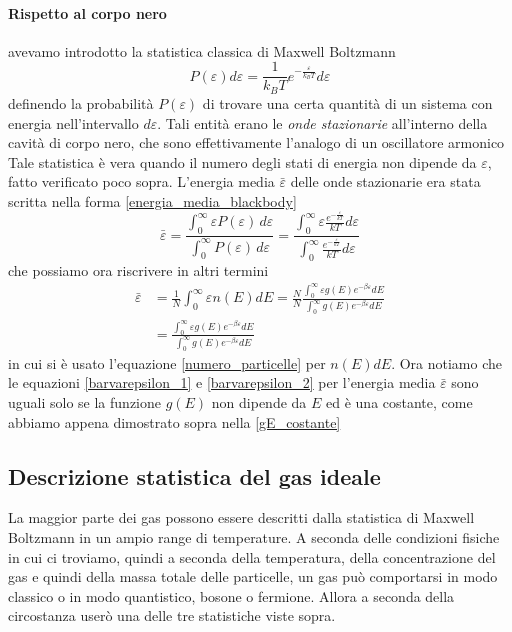 \paragraph{Rispetto al corpo nero} avevamo introdotto la statistica classica di Maxwell Boltzmann 
\begin{equation}
P(\varepsilon) d\varepsilon = \frac{1}{k_BT} e^{ -\frac{\varepsilon}{k_BT} } d\varepsilon
\end{equation}
definendo la probabilità $P(\varepsilon)$ di trovare una certa quantità di un sistema con energia nell'intervallo $d\varepsilon$.
Tali entità erano le \textit{onde stazionarie} all'interno della cavità di corpo nero, che sono effettivamente l'analogo di un oscillatore armonico
Tale statistica è vera quando il numero degli stati di energia non dipende da $\varepsilon$, fatto verificato poco sopra.
L'energia media $\bar \varepsilon$ delle onde stazionarie era stata scritta nella forma \ref{energia_media_blackbody}
\begin{equation}
\bar\varepsilon=\frac{\int_{0}^{\infty} \varepsilon P(\varepsilon)\,d\varepsilon}{\int_{0}^{\infty} P(\varepsilon)\,d\varepsilon} = \frac{\int_{0}^{\infty} \varepsilon \frac{ e^{ - \frac{\varepsilon}{kT } } }{kT } d\varepsilon}{\int_{0}^{\infty} \frac{ e^{ - \frac{\varepsilon}{kT } } }{kT }d\varepsilon}
\label{barvarepsilon_1}
\end{equation}
che possiamo ora riscrivere in altri termini
\begin{equation}
\begin{split}
\bar \varepsilon & = \frac{1}{N} \int_0^{\infty} \varepsilon n(E)dE = \frac{N}{N} \frac{  \int_0^{\infty} \varepsilon g(E) e^{ -\beta \varepsilon } dE  }{  \int_0^{\infty} g(E) e^{ -\beta \varepsilon } dE  } \\
& = \frac{  \int_0^{\infty} \varepsilon g(E) e^{ -\beta \varepsilon } dE  }{  \int_0^{\infty} g(E) e^{ -\beta \varepsilon } dE  }
\label{barvarepsilon_2}
\end{split}
\end{equation}
in cui si è usato l'equazione \ref{numero_particelle} per  $n(E)dE$.
Ora notiamo che le equazioni \ref{barvarepsilon_1} e \ref{barvarepsilon_2} per l'energia media $\bar \varepsilon$ sono uguali solo se la funzione $g(E)$ non dipende da $E$ ed è una costante, come abbiamo appena dimostrato sopra nella \ref{gE_costante}


\subsection{Descrizione statistica del gas ideale}
La maggior parte dei gas possono essere descritti dalla statistica di Maxwell Boltzmann in un ampio range di temperature.
A seconda delle condizioni fisiche in cui ci troviamo, quindi a seconda della temperatura, della concentrazione del gas e quindi della massa totale delle particelle, un gas può comportarsi in modo classico o in modo quantistico, bosone o fermione. 
Allora a seconda della circostanza userò una delle tre statistiche viste sopra.

